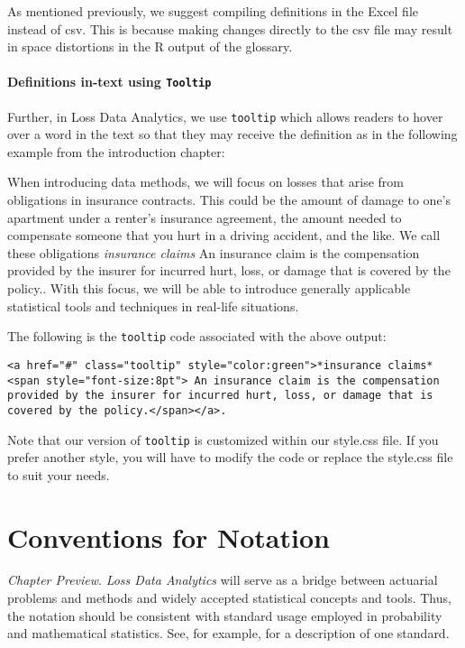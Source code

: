 \documentclass[
]{book}
\begin{document}
As mentioned previously, we suggest compiling definitions in the Excel file instead of csv. This is because making changes directly to the csv file may result in space distortions in the R output of the glossary.

\hypertarget{definitions-in-text-using-tooltip}{%
\subsubsection{\texorpdfstring{Definitions in-text using \texttt{Tooltip}}{Definitions in-text using Tooltip}}\label{definitions-in-text-using-tooltip}}

Further, in Loss Data Analytics, we use \texttt{tooltip} which allows readers to hover over a word in the text so that they may receive the definition as in the following example from the introduction chapter:

When introducing data methods, we will focus on losses that arise from obligations in insurance contracts. This could be the amount of damage to one's apartment under a renter's insurance agreement, the amount needed to compensate someone that you hurt in a driving accident, and the like. We call these obligations \emph{insurance claims}{ An insurance claim is the compensation provided by the insurer for incurred hurt, loss, or damage that is covered by the policy.}. With this focus, we will be able to introduce generally applicable statistical tools and techniques in real-life situations.

The following is the \texttt{tooltip} code associated with the above output:

\begin{verbatim}
<a href="#" class="tooltip" style="color:green">*insurance claims*<span style="font-size:8pt"> An insurance claim is the compensation provided by the insurer for incurred hurt, loss, or damage that is covered by the policy.</span></a>.
\end{verbatim}

Note that our version of \texttt{tooltip} is customized within our style.css file. If you prefer another style, you will have to modify the code or replace the style.css file to suit your needs.

\hypertarget{S:NotationConvention}{%
\chapter{Conventions for Notation}\label{S:NotationConvention}}

\emph{Chapter Preview}. \emph{Loss Data Analytics} will serve as a bridge between actuarial problems and methods and widely accepted statistical concepts and tools. Thus, the notation should be consistent with standard usage employed in probability and mathematical statistics. See, for example, \citep{halperin1965recommended} for a description of one standard.
\end{document}
